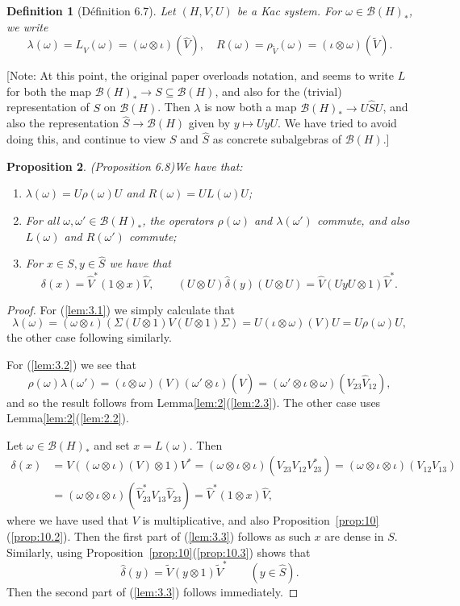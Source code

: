 \documentclass[a4paper,12pt]{article}
\theoremstyle{plain}
\newtheorem{proposition}{Proposition}[section]
\newtheorem{definition}[proposition]{Definition}
\theoremstyle{definition}
\newcommand{\mc}{\mathcal}
\begin{document}
\begin{definition}[D\'efinition 6.7]
Let $(H,V,U)$ be a Kac system.  For $\omega\in\mc B(H)_*$, we write
\[ \lambda(\omega) = L_{\hat V}(\omega) = (\omega\otimes\iota)(\hat V), \quad
R(\omega) = \rho_{\tilde V}(\omega) = (\iota\otimes\omega)(\tilde V). \]
\end{definition}

[Note: At this point, the original paper overloads notation, and seems to
write $L$ for both the map $\mc B(H)_*\rightarrow S\subseteq\mc B(H)$, and
also for the (trivial) representation of $S$ on $\mc B(H)$.  Then $\lambda$
is now both a map $\mc B(H)_*\rightarrow U\hat SU$, and also the representation
$\hat S\rightarrow \mc B(H)$ given by $y\mapsto UyU$.
We have tried to avoid doing this, and continue to view $S$ and $\hat S$
as concrete subalgebras of $\mc B(H)$.]

\begin{proposition}(Proposition 6.8)\label{lem:3}
We have that:
\begin{enumerate}
\item\label{lem:3.1} $\lambda(\omega) = U \rho(\omega) U$ and
$R(\omega) = UL(\omega)U$;
\item\label{lem:3.2} For all $\omega,\omega'\in\mc B(H)_*$, the operators
$\rho(\omega)$ and $\lambda(\omega')$ commute, and also
$L(\omega)$ and $R(\omega')$ commute;
\item\label{lem:3.3} For $x\in S,y\in\hat S$ we have that
\[ \delta(x) = \hat V^*(1\otimes x)\hat V, \qquad
(U\otimes U)\hat\delta(y)(U\otimes U) = \hat V(UyU\otimes 1)\hat V^*. \]
\end{enumerate}
\end{proposition}
\begin{proof}
For (\ref{lem:3.1}) we simply calculate that
\[ \lambda(\omega) = (\omega\otimes\iota)(\Sigma(U\otimes 1)V(U\otimes 1)\Sigma)
= U (\iota\otimes\omega)(V) U = U\rho(\omega)U, \]
the other case following similarly.

For (\ref{lem:3.2}) we see that
\[ \rho(\omega) \lambda(\omega')
= (\iota\otimes\omega)(V) (\omega'\otimes\iota)(\hat V)
= (\omega'\otimes\iota\otimes\omega)(V_{23} \hat V_{12}), \]
and so the result follows from Lemma\ref{lem:2}(\ref{lem:2.3}).
The other case uses Lemma\ref{lem:2}(\ref{lem:2.2}).

Let $\omega\in\mc B(H)_*$ and set $x=L(\omega)$.  Then
\begin{align*} \delta(x) &= V((\omega\otimes\iota)(V)\otimes 1)V^* = 
(\omega\otimes\iota\otimes\iota)(V_{23}V_{12}V_{23}^*)
= (\omega\otimes\iota\otimes\iota)(V_{12}V_{13}) \\
&= (\omega\otimes\iota\otimes\iota)(\hat V_{23}^* V_{13} \hat V_{23})
= \hat V^*(1\otimes x)\hat V, \end{align*}
where we have used that $V$ is multiplicative, and also
Proposition~\ref{prop:10}(\ref{prop:10.2}).  Then the first part of
(\ref{lem:3.3}) follows as such $x$ are dense in $S$.
Similarly, using Proposition~\ref{prop:10}(\ref{prop:10.3}) shows that
\[ \hat\delta(y) = \tilde V (y\otimes 1) \tilde V^*
\qquad (y\in\hat S). \]
Then the second part of (\ref{lem:3.3}) follows immediately.
\end{proof}
\end{document}
